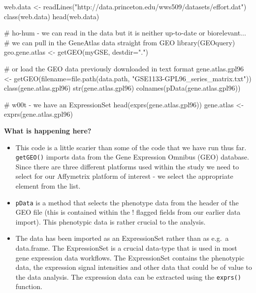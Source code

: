 \documentclass[a4paper]{book}
\newenvironment{Shaded}{}{}
\newcommand{\KeywordTok}[1]{\textcolor[rgb]{0.00,0.00,1.00}{{#1}}}
\newcommand{\DataTypeTok}[1]{{#1}}
\newcommand{\StringTok}[1]{\textcolor[rgb]{0.00,0.50,0.50}{{#1}}}
\newcommand{\CommentTok}[1]{\textcolor[rgb]{0.00,0.50,0.00}{{#1}}}
\newcommand{\NormalTok}[1]{{#1}}
\newlength{\leftbarwidth}
\newlength{\leftbarsep}
\newcommand*{\leftbarcolorcmd}{\color{darkgray}}%
\renewenvironment{leftbar}{%
    \def\FrameCommand{{\leftbarcolorcmd{\vrule width \leftbarwidth\relax\hspace {\leftbarsep}}}}%
    \MakeFramed {\advance \hsize -\width \FrameRestore }%
}{%
    \endMakeFramed
}
\renewenvironment{Shaded}
{\vspace{0em}\begin{leftbar}\begin{snugshade}}
{\end{snugshade}\end{leftbar}\vspace{0pt}}
\begin{document}
\begin{Shaded}
\begin{Highlighting}[]
\NormalTok{web.data <-}\StringTok{ }\KeywordTok{readLines}\NormalTok{(}\StringTok{"http://data.princeton.edu/wws509/datasets/effort.dat"}\NormalTok{)}
\KeywordTok{class}\NormalTok{(web.data)}
\KeywordTok{head}\NormalTok{(web.data)}

\CommentTok{# ho-hum - we can read in the data but it is neither up-to-date or biorelevant...}
\CommentTok{# we can pull in the GeneAtlas data straight from GEO}
\KeywordTok{library}\NormalTok{(GEOquery)}
\NormalTok{geo.gene.atlas <-}\StringTok{ }\KeywordTok{getGEO}\NormalTok{(myGSE, }\DataTypeTok{destdir=}\StringTok{"."}\NormalTok{)}

\CommentTok{# or load the GEO data previously downloaded in text format}
\NormalTok{gene.atlas.gpl96 <-}\StringTok{ }\KeywordTok{getGEO}\NormalTok{(}\DataTypeTok{filename=}\KeywordTok{file.path}\NormalTok{(data.path,}
                                              \StringTok{"GSE1133-GPL96_series_matrix.txt"}\NormalTok{))}
\KeywordTok{class}\NormalTok{(gene.atlas.gpl96)}
\KeywordTok{str}\NormalTok{(gene.atlas.gpl96)}
\KeywordTok{colnames}\NormalTok{(}\KeywordTok{pData}\NormalTok{(gene.atlas.gpl96))}

\CommentTok{# w00t - we have an ExpressionSet}
\KeywordTok{head}\NormalTok{(}\KeywordTok{exprs}\NormalTok{(gene.atlas.gpl96))}
\NormalTok{gene.atlas <-}\StringTok{ }\KeywordTok{exprs}\NormalTok{(gene.atlas.gpl96)}
\end{Highlighting}
\end{Shaded}

\textbf{What is happening here?}

\begin{itemize}
\item
  This code is a little scarier than some of the code that we have run
  thus far. \texttt{getGEO()} imports data from the Gene Expression
  Omnibus (GEO) database. Since there are three different platforms used
  within the study we need to select for our Affymetrix platform of
  interest - we select the appropriate element from the list.
\item
  \texttt{pData} is a method that selects the phenotype data from the
  header of the GEO file (this is contained within the ! flagged fields
  from our earlier data import). This phenotypic data is rather crucial
  to the analysis.
\item
  The data has been imported as an ExpressionSet rather than as e.g.~a
  data.frame. The ExpressionSet is a crucial data-type that is used in
  most gene expression data workflows. The ExpressionSet contains the
  phenotypic data, the expression signal intensities and other data that
  could be of value to the data analysis. The expression data can be
  extracted using the \texttt{exprs()} function.
\end{itemize}
\end{document}

